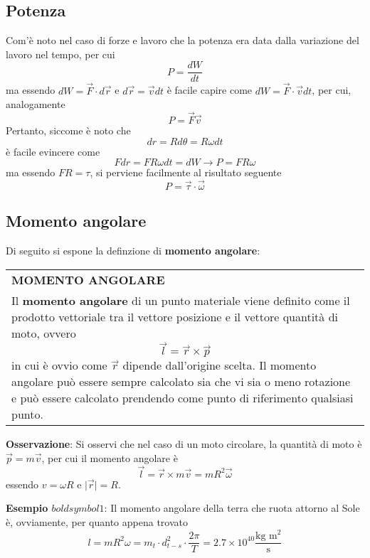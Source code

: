 \documentclass[a4paper]{extarticle}
\renewcommand\arraystretch{}
\begin{document}
\vspace{1em}
\subsection{Potenza}
Com'è noto nel caso di forze e lavoro che la potenza era data dalla variazione del lavoro nel tempo, per cui
\[\boxed{P=\frac{dW}{dt}}\]
ma essendo $dW=\vec F \cdot d \vec r$ e $d \vec r = \vec v dt$ è facile capire come $dW=\vec F \cdot \vec v dt$, per cui, analogamente
\[\boxed{P=\vec F \vec v}\]
Pertanto, siccome è noto che
\[dr = R d\theta = R \omega dt\]
è facile evincere come
\[F dr = F R \omega dt = dW \longrightarrow P=FR \omega\]
ma essendo $FR=\tau$, si perviene facilmente al risultato seguente
\[\boxed{P=\vec \tau \cdot \vec \omega}\]


\vspace{1em}
\subsection{Momento angolare}
Di seguito si espone la definzione di \textbf{momento angolare}:

\vspace{1em}
\setlength{\tabcolsep}{14pt}
\renewcommand{\arraystretch}{2}
\noindent
\begin{tabularx}{\textwidth}{@{}|P|@{}}
    \hline
    {\textbf{MOMENTO ANGOLARE}}\\
    \parbox{\linewidth}{Il \textbf{momento angolare} di un punto materiale viene definito come il prodotto vettoriale tra il vettore posizione e il vettore quantità di moto, ovvero
    \[\boxed{\vec l = \vec r \times \vec p}\]
    in cui è ovvio come $\vec r$ dipende dall'origine scelta. Il momento angolare può essere sempre calcolato sia che vi sia o meno rotazione e può essere calcolato prendendo come punto di riferimento qualsiasi punto.
    \vspace{3mm}}\\
    \hline
\end{tabularx}

\vspace{1em}
\noindent
\textbf{Osservazione}: Si osservi che nel caso di un moto circolare, la quantità di moto è $\vec p = m \vec v$, per cui il momento angolare è
\[\vec l = \vec r \times m \vec v = mR^2 \vec \omega\]
essendo $v=\omega R$ e $\vert \vec r \vert = R$.

\vspace{1em}
\noindent
\textbf{Esempio $boldsymbol{1}$}: Il momento angolare della terra che ruota attorno al Sole è, ovviamente, per quanto appena trovato
\[l=mR^2 \omega = m_t \cdot d_{t-s}^2 \cdot \frac{2\pi}{T} = 2.7 \times 10^{40} \frac{\text{kg m}^2}{\text{s}}\]
\end{document}
